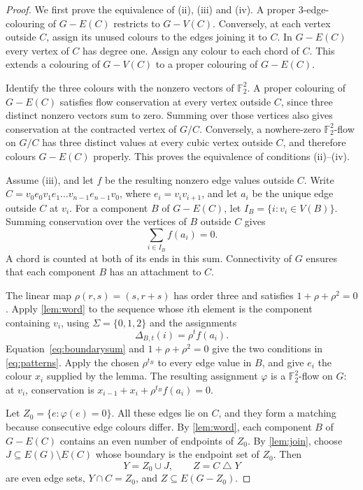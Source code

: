 \documentclass[justified,notoc,twoside,nobib,nofonts]{tufte-handout}
\newcommand{\K}{\mathbb F_2^2}
\newcommand{\sd}{\mathbin{\triangle}}
\begin{document}
\prescribedcircuit*
\begin{proof}
We first prove the equivalence of (ii), (iii) and (iv).
A proper 3-edge-colouring of $G-E(C)$ restricts to $G-V(C)$.
Conversely, at each vertex outside $C$, assign its unused
colours to the edges joining it to $C$. In $G-E(C)$ every vertex of
$C$ has degree one. Assign any colour to each chord of $C$. This
extends a colouring of $G-V(C)$ to a proper colouring of $G-E(C)$.

Identify the three colours with the nonzero vectors of $\K$. A
proper colouring of $G-E(C)$ satisfies flow conservation at every
vertex outside $C$, since three distinct nonzero vectors sum to zero.
Summing over those vertices also gives conservation at the contracted
vertex of $G/C$. Conversely, a nowhere-zero $\K$-flow on $G/C$
has three distinct values at every cubic vertex outside $C$, and
therefore colours $G-E(C)$ properly. This proves the equivalence of
conditions (ii)--(iv).

Assume (iii), and let $f$ be the resulting nonzero edge values outside
$C$. Write $C=v_0e_0v_1e_1\dots v_{n-1}e_{n-1}v_0$, where
$e_i=v_iv_{i+1}$, and let $a_i$ be the unique edge outside $C$ at $v_i$.
For a component $B$ of $G-E(C)$, let $I_B=\{i:v_i\in V(B)\}$.
Summing conservation over the vertices of $B$ outside $C$ gives
\begin{equation}\label{eq:boundarysum}
  \sum_{i\in I_B}f(a_i)=0.
\end{equation}
A chord is counted at both of its ends in this sum. Connectivity of
$G$ ensures that each component $B$ has an attachment to $C$.

The linear map $\rho(r,s)=(s,r+s)$ has order three and satisfies
$1+\rho+\rho^2=0$. Apply \cref{lem:word} to the sequence whose $i$th
element is the component containing $v_i$, using $\Sigma=\{0,1,2\}$
and the assignments
\[
  \Delta_{B,t}(i)=\rho^t f(a_i).
\]
Equation~\eqref{eq:boundarysum} and $1+\rho+\rho^2=0$ give the two
conditions in \eqref{eq:patterns}. Apply the chosen
$\rho^{t_B}$ to every edge value in $B$, and give $e_i$ the colour
$x_i$ supplied by the lemma. The resulting assignment $\varphi$ is a
$\K$-flow on $G$: at $v_i$, conservation is
$x_{i-1}+x_i+\rho^{t_B}f(a_i)=0$.

Let $Z_0=\{e:\varphi(e)=0\}$. All these edges lie on $C$, and they
form a matching because consecutive edge colours differ. By
\cref{lem:word}, each component $B$ of $G-E(C)$ contains an even
number of endpoints of $Z_0$.
By \cref{lem:join}, choose $J\subseteq E(G)\setminus E(C)$ whose
boundary is the endpoint set of $Z_0$. Then
\[
  Y=Z_0\cup J,\qquad Z=C\sd Y
\]
are even edge sets, $Y\cap C=Z_0$, and $Z\subseteq E(G-Z_0)$.


\end{proof}
\end{document}
